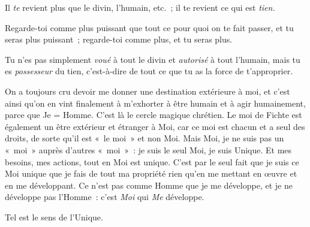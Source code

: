 \documentclass[french,twoside]{book} %
\begin{document}
Il \emph{te} revient plus que le divin, l’humain, etc. ; il te revient ce qui est \emph{tien.}\par
Regarde-toi comme plus puissant que tout ce pour quoi on te fait passer, et tu seras plus puissant ; regarde-toi comme plus, et tu seras plus.\par
Tu n’es pas simplement \emph{voué} à tout le divin et \emph{autorisé} à tout l’humain, mais tu es \emph{possesseur} du tien, c’est-à-dire de tout ce que tu as la force de t’approprier.\par
On a toujours cru devoir me donner une destination extérieure à moi, et c’est ainsi qu’on en vint finalement à m’exhorter à être humain et à agir humainement, parce que Je = Homme. C’est là le cercle magique chrétien. Le moi de Fichte est également un être extérieur et étranger à Moi, car ce moi est chacun et a seul des droits, de sorte qu’il est « le moi » et non Moi. Mais Moi, je ne suis pas un « moi » auprès d’autres « moi » : je suis le seul Moi, je suis Unique. Et mes besoins, mes actions, tout en Moi est unique. C’est par le seul fait que je suis ce Moi unique que je fais de tout ma propriété rien qu’en me mettant en œuvre et en me développant. Ce n’est pas comme Homme que je me développe, et je ne développe pas l’Homme : c’est \emph{Moi} qui \emph{Me} développe.\par
Tel est le sens de l’Unique.
\end{document}
